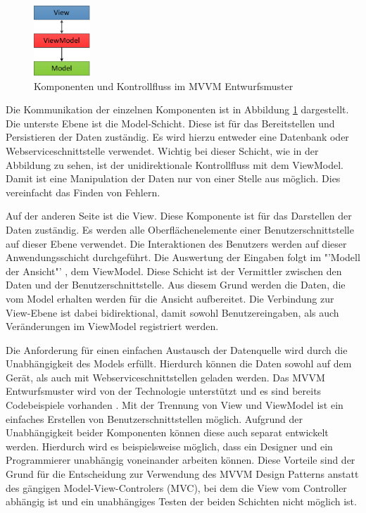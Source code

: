 \begin{figure}[H]
\centering
\includegraphics[height=100px]{images/mvvm}
\caption{Komponenten und Kontrollfluss im MVVM Entwurfsmuster}
\label{mvvm}
\end{figure}
Die Kommunikation der einzelnen Komponenten ist in Abbildung \ref{mvvm} dargestellt. Die unterste Ebene ist die Model-Schicht. Diese ist für das Bereitstellen und Persistieren der Daten zuständig. Es wird hierzu entweder eine Datenbank oder Webserviceschnittstelle verwendet. Wichtig bei dieser Schicht, wie in der Abbildung zu sehen, ist der unidirektionale Kontrollfluss mit dem ViewModel. Damit ist eine Manipulation der Daten nur von einer Stelle aus möglich. Dies vereinfacht das Finden von Fehlern. \par
Auf der anderen Seite ist die View. Diese Komponente ist für das Darstellen der Daten zuständig. Es werden alle Oberflächenelemente einer Benutzerschnittstelle auf dieser Ebene verwendet. Die Interaktionen des Benutzers werden auf dieser Anwendungsschicht durchgeführt. Die Auswertung der Eingaben folgt im "'Modell der Ansicht"' \cite[S.9]{bib:mvvm}, dem ViewModel. Diese Schicht ist der Vermittler zwischen den Daten und der Benutzerschnittstelle. Aus diesem Grund werden die Daten, die vom Model erhalten werden für die Ansicht aufbereitet. Die Verbindung zur View-Ebene ist dabei bidirektional, damit sowohl Benutzereingaben, als auch Veränderungen im ViewModel registriert werden. \par

Die Anforderung für einen einfachen Austausch der Datenquelle wird durch die Unabhängigkeit des Models erfüllt. Hierdurch können die Daten sowohl auf dem Gerät, als auch mit Webserviceschnittstellen geladen werden. Das MVVM Entwurfsmuster wird von der Technologie unterstützt und es sind bereits Codebeispiele vorhanden \cite{bib:winMvvm}. Mit der Trennung von View und ViewModel ist ein einfaches Erstellen von Benutzerschnittstellen möglich. Aufgrund der Unabhängigkeit beider Komponenten können diese auch separat entwickelt werden. Hierdurch wird es beispielsweise möglich, dass ein Designer und ein Programmierer unabhängig voneinander arbeiten können. Diese Vorteile sind der Grund für die Entscheidung zur Verwendung des MVVM Design Patterns anstatt des gängigen Model-View-Controlers (MVC), bei dem die View vom Controller abhängig ist und ein unabhängiges Testen der beiden Schichten nicht möglich ist.

